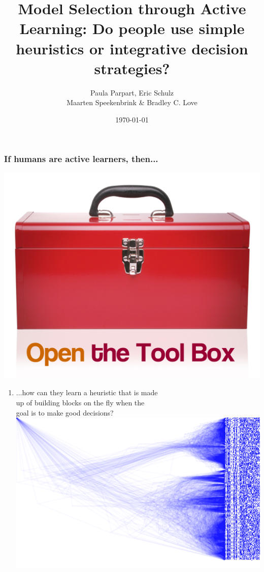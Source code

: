 \documentclass{beamer}
\begin{document}
\title[Behavioural Science Conference, Stirling]{Model Selection through Active Learning: Do people use simple heuristics or integrative decision strategies?}
\author[Parpart, Schulz, Speekenbrink \& Love]{Paula Parpart, Eric Schulz \\Maarten Speekenbrink \& Bradley C. Love}
\date{\today}



\begin{frame}
\end{frame}

\begin{frame}
 \frametitle{If humans are active learners, then...}
\hfill \includegraphics[scale=0.05]{toolbox.jpg}\vspace{-2cm}
\begin{enumerate}
\item  ...how can they learn a heuristic that is made\\ 
up of building blocks on the fly when the\\
goal is to make good decisions?\bigskip\\\vspace{1cm}
 \hfill \includegraphics[scale=0.08]{tree.png}\vspace{-2cm}

\end{enumerate}
\end{frame}
\end{document}
